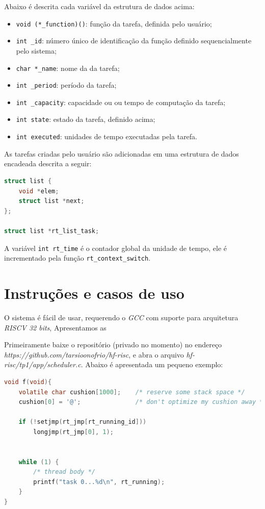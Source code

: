\documentclass[a4 paper]{article}
\begin{document}
Abaixo é descrita cada variável da estrutura de dados acima:
\begin{itemize}
\item \verb|void (*_function)()|: função da tarefa, definida pelo usuário;
\item \verb|int _id|: número único de identificação da função definido sequencialmente pelo sistema;
\item \verb|char *_name|: nome da da tarefa; 
\item \verb|int _period|: período da tarefa;
\item \verb|int _capacity|: capacidade ou ou tempo de computação da tarefa;  
\item \verb|int state|: estado da tarefa, definido acima;
\item \verb|int executed|: unidades de tempo executadas pela tarefa.
\end{itemize}


As tarefas criadas pelo usuário são adicionadas em uma estrutura de dados encadeada descrita a seguir:
\begin{lstlisting}[captionpos=b, language=C, caption=Lista encadeada]
struct list {
	void *elem;
	struct list *next;
};

struct list *rt_list_task;
\end{lstlisting}


A variável \verb|int rt_time|  é o contador global da unidade de tempo, ele é incrementado pela função 
\verb|rt_context_switch|.


\section{Instruções e casos de uso}

O sistema é fácil de usar, requerendo o \textit{GCC} com suporte para arquitetura \textit{RISCV 32 bits}, Apresentamos as 

Primeiramente baixe o repositório (privado no momento) no endereço \textit{https://github.com/tarsioonofrio/hf-risc}, e abra o arquivo  \textit{hf-risc/tp1/app/scheduler.c}. Abaixo é apresentada um pequeno exemplo:

\begin{lstlisting}[captionpos=b, language=C, caption=Função de exemplo]
void f(void){
    volatile char cushion[1000];	/* reserve some stack space */
    cushion[0] = '@';	        	/* don't optimize my cushion away */

    if (!setjmp(rt_jmp[rt_running_id]))
        longjmp(rt_jmp[0], 1);


    while (1) {
        /* thread body */
        printf("task 0...%d\n", rt_running);
    }
}
\end{lstlisting}
\end{document}
